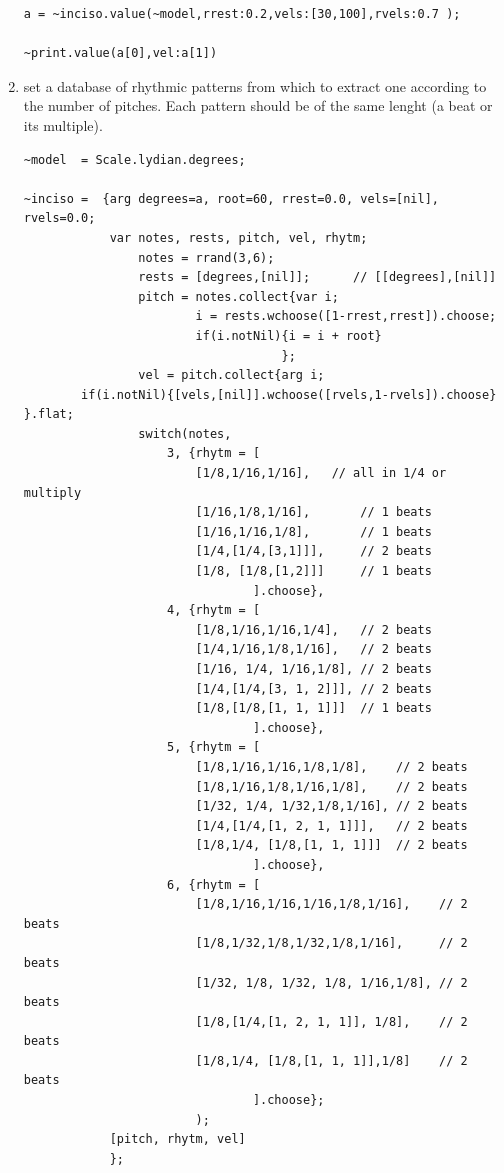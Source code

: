 \begin{enumerate}
\begin{lstlisting}[frame=single]
a = ~inciso.value(~model,rrest:0.2,vels:[30,100],rvels:0.7 );

~print.value(a[0],vel:a[1])
\end{lstlisting}

\item set a database of rhythmic patterns from which to extract one according to the number of pitches. Each pattern should be of the same lenght (a beat or its multiple).

\begin{lstlisting}[frame=single] 
~model  = Scale.lydian.degrees; 

~inciso =  {arg degrees=a, root=60, rrest=0.0, vels=[nil], rvels=0.0;
            var notes, rests, pitch, vel, rhytm;
                notes = rrand(3,6);
                rests = [degrees,[nil]];      // [[degrees],[nil]]
                pitch = notes.collect{var i; 
                        i = rests.wchoose([1-rrest,rrest]).choose;
                        if(i.notNil){i = i + root}
                                    };
                vel = pitch.collect{arg i;
        if(i.notNil){[vels,[nil]].wchoose([rvels,1-rvels]).choose} }.flat;
                switch(notes,
                    3, {rhytm = [   
                        [1/8,1/16,1/16],   // all in 1/4 or multiply
                        [1/16,1/8,1/16],       // 1 beats
                        [1/16,1/16,1/8],       // 1 beats
                        [1/4,[1/4,[3,1]]],     // 2 beats
                        [1/8, [1/8,[1,2]]]     // 1 beats
                                ].choose},
                    4, {rhytm = [   
                        [1/8,1/16,1/16,1/4],   // 2 beats
                        [1/4,1/16,1/8,1/16],   // 2 beats
                        [1/16, 1/4, 1/16,1/8], // 2 beats
                        [1/4,[1/4,[3, 1, 2]]], // 2 beats
                        [1/8,[1/8,[1, 1, 1]]]  // 1 beats
                                ].choose},
                    5, {rhytm = [   
                        [1/8,1/16,1/16,1/8,1/8],    // 2 beats
                        [1/8,1/16,1/8,1/16,1/8],    // 2 beats
                        [1/32, 1/4, 1/32,1/8,1/16], // 2 beats
                        [1/4,[1/4,[1, 2, 1, 1]]],   // 2 beats
                        [1/8,1/4, [1/8,[1, 1, 1]]]  // 2 beats
                                ].choose},
                    6, {rhytm = [   
                        [1/8,1/16,1/16,1/16,1/8,1/16],    // 2 beats
                        [1/8,1/32,1/8,1/32,1/8,1/16],     // 2 beats
                        [1/32, 1/8, 1/32, 1/8, 1/16,1/8], // 2 beats
                        [1/8,[1/4,[1, 2, 1, 1]], 1/8],    // 2 beats
                        [1/8,1/4, [1/8,[1, 1, 1]],1/8]    // 2 beats
                                ].choose};
                        );   
            [pitch, rhytm, vel]
            };


\end{lstlisting}
\end{enumerate}
